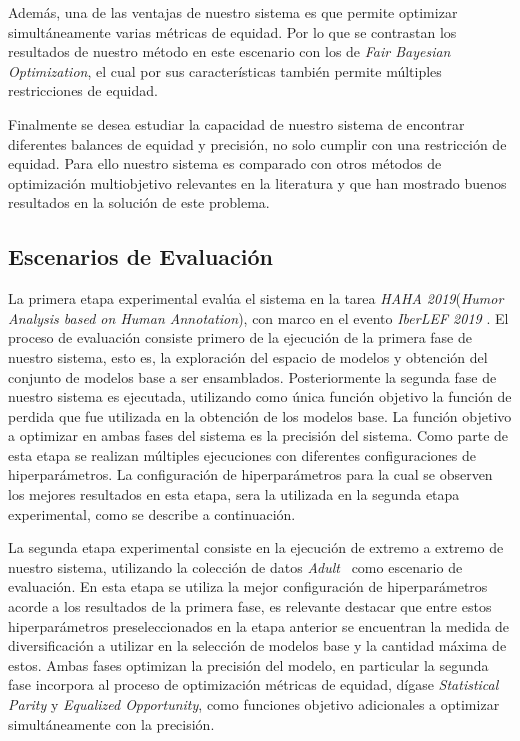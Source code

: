 Además, una de las ventajas de nuestro sistema es que permite optimizar simultáneamente varias métricas de equidad.
Por lo que se contrastan los resultados de nuestro método en este escenario con los de \emph{Fair Bayesian Optimization}, el cual por sus características también permite múltiples restricciones de equidad.

Finalmente se desea estudiar la capacidad de nuestro sistema de encontrar diferentes balances de equidad y precisión, no solo cumplir con una restricción de equidad.
Para ello nuestro sistema es comparado con otros métodos de optimización multiobjetivo relevantes en la literatura y que han mostrado buenos resultados en la solución de este problema.

\subsection{Escenarios de Evaluación}\label{section:evaluation-scenaries}

La primera etapa experimental evalúa el sistema en la tarea \emph{HAHA 2019}(\textit{Humor Analysis based on Human Annotation}), con marco en el evento \textit{IberLEF 2019} \parencite{chiruzzo2019overview}.
El proceso de evaluación consiste primero de la ejecución de la primera fase de nuestro sistema, esto es, la exploración del espacio de modelos y obtención del conjunto de modelos base a ser ensamblados.
Posteriormente la segunda fase de nuestro sistema es ejecutada, utilizando como única función objetivo la función de perdida que fue utilizada en la obtención de los modelos base.
La función objetivo a optimizar en ambas fases del sistema es la precisión del sistema.
Como parte de esta etapa se realizan múltiples ejecuciones con diferentes configuraciones de hiperparámetros.
La configuración de hiperparámetros para la cual se observen los mejores resultados en esta etapa, sera la utilizada en la segunda etapa experimental, como se describe a continuación.

La segunda etapa experimental consiste en la ejecución de extremo a extremo de nuestro sistema, utilizando la colección de datos \emph{Adult}~\parencite{ucidata} como escenario de evaluación.
En esta etapa se utiliza la mejor configuración de hiperparámetros acorde a los resultados de la primera fase, es relevante destacar que entre estos hiperparámetros preseleccionados en la etapa anterior se encuentran la medida de diversificación a utilizar en la selección de modelos base y la cantidad máxima de estos.
Ambas fases optimizan la precisión del modelo, en particular la segunda fase incorpora al proceso de optimización métricas de equidad, dígase \emph{Statistical Parity} y \emph{Equalized Opportunity}, como funciones objetivo adicionales a optimizar simultáneamente con la precisión.

